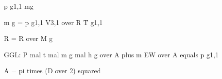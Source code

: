 p g1,1 mg

m g = p g1,1 V3,1 over R T g1,1

R = R over M g

GGL: P mal t mal m g mal h g over A plus m EW over A equals p g1,1

A = pi times (D over 2) squared